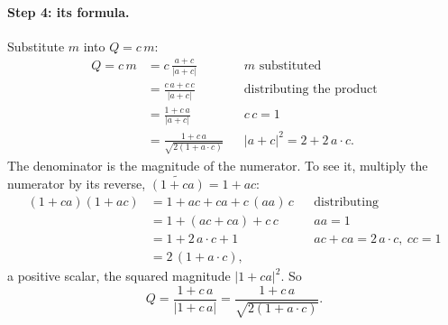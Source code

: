 \paragraph{Step 4: its formula.} Substitute $m$ into $Q = c\,m$:
\begin{align*}
Q = c\, m &= c\,\frac{a + c}{|a + c|} && m \text{ substituted} \\
&= \frac{c\,a + c\,c}{|a + c|} && \text{distributing the product} \\
&= \frac{1 + c\,a}{|a + c|} && c\,c = 1 \\
&= \frac{1 + c\,a}{\sqrt{2 (1 + a \cdot c)}} && |a + c|^2 = 2 + 2\,a\cdot c .
\end{align*}
The denominator is the magnitude of the numerator. To see it, multiply the numerator by its reverse, $\widetilde{(1 + ca)} = 1 + ac$:
\begin{align*}
(1 + c a)(1 + a c) &= 1 + a c + c a + c\,(a a)\, c && \text{distributing} \\
&= 1 + (a c + c a) + c\, c && a a = 1 \\
&= 1 + 2\,a\cdot c + 1 && a c + c a = 2\, a\cdot c,\ c c = 1 \\
&= 2\,(1 + a\cdot c) ,
\end{align*}
a positive scalar, the squared magnitude $|1 + ca|^2$. So
\begin{equation}
\label{eqn:ga_rotor}
Q = \frac{1 + c\, a}{|1 + c\, a|} = \frac{1 + c\, a}{\sqrt{2 (1 + a \cdot c)}} .
\end{equation}

